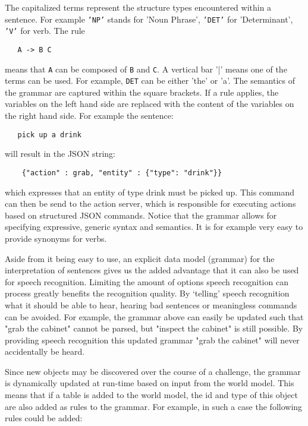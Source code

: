 The capitalized terms represent the structure types encountered within a sentence. For example \texttt{'NP'} stands for 'Noun Phrase', \texttt{'DET'} for 'Determinant', \texttt{'V'} for verb. The rule

\begin{lstlisting}
   A -> B C
\end{lstlisting}   

means that \texttt{A} can be composed of \texttt{B} and \texttt{C}. A vertical bar '|' means one of the terms can be used. For example, \texttt{DET} can be either 'the' or 'a'. The semantics of the grammar are captured within the square brackets. If a rule applies, the variables on the left hand side are replaced with the content of the variables on the right hand side. For example the sentence:

\begin{lstlisting}
   pick up a drink
\end{lstlisting}

will result in the JSON string:

\begin{lstlisting}
    {"action" : grab, "entity" : {"type": "drink"}}
\end{lstlisting}

which expresses that an entity of type drink must be picked up. This command can then be send to the action server, which is responsible for executing actions based on structured JSON commands. Notice that the grammar allows for specifying expressive, generic syntax and semantics. It is for example very easy to provide synonyms for verbs.

Aside from it being easy to use, an explicit data model (grammar) for the interpretation of sentences gives us the added advantage that it can also be used for speech recognition. Limiting the amount of options speech recognition can process greatly benefits the recognition quality. By `telling' speech recognition what it should be able to hear, hearing bad sentences or meaningless commands can be avoided. For example, the grammar above can easily be updated such that "grab the cabinet" cannot be parsed, but "inspect the cabinet" is still possible. By providing speech recognition this updated grammar "grab the cabinet" will never accidentally be heard.

Since new objects may be discovered over the course of a challenge, the grammar is dynamically updated at run-time based on input from the world model. This means that if a table is added to the world model, the id and type of this object are also added as rules to the grammar. For example, in such a case the following rules could be added:

